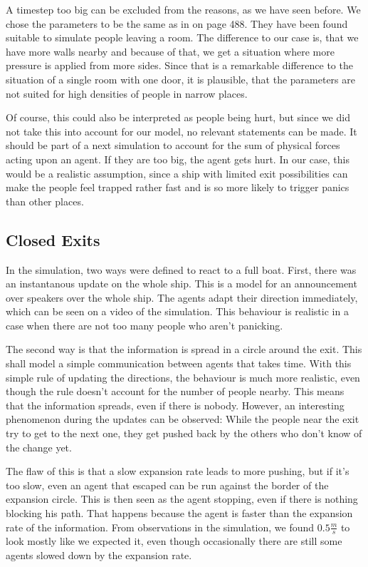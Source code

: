 \documentclass[11pt]{article}
\begin{document}
A timestep too big can be excluded from the reasons, as we have seen before.
We chose the parameters to be the same as in \cite{helbing} on page 488.
They have been found suitable to simulate people leaving a room.
The difference to our case is, that we have more walls nearby and
because of that, we get a situation where more pressure is applied from more sides. 
Since that is a remarkable difference to the situation of a single room with one door, 
it is plausible, that the parameters are not suited for high densities of people in 
narrow places. 

Of course, this could also be interpreted as people being hurt, but since
we did not take this into account for our model, no relevant statements can
be made. It should be part of a next simulation to account for the sum of 
physical forces acting upon an agent. If they are too big, the agent gets hurt.
In our case, this would be a realistic assumption, since a ship with limited
exit possibilities can make the people feel trapped rather fast and is so more
likely to trigger panics than other places.



\subsection{Closed Exits} %
\label{sub:Closed exits}

In the simulation, two ways were defined to react to a full boat.  First, there
was an instantanous update on the whole ship.  This is a model for an
announcement over speakers over the whole ship.  The agents adapt their
direction immediately, which can be seen on a video of the simulation.  This
behaviour is realistic in a case when there are not too many people who aren't
panicking.

The second way is that the information is spread in a circle around the exit.
This shall model a simple communication between agents that takes time.  With
this simple rule of updating the directions, the behaviour is much more
realistic, even though the rule doesn't account for the number of people
nearby.  This means that the information spreads, even if there is nobody.
However, an interesting phenomenon during the updates can be observed:  While
the people near the exit try to get to the next one, they get pushed back by
the others who don't know of the change yet.

The flaw of this is that a slow expansion rate leads to more pushing, but if
it's too slow, even an agent that escaped can be run against the border of the
expansion circle.  This is then seen as the agent stopping, even if there is
nothing blocking his path. That happens because the agent is faster than the
expansion rate of the information. From observations in the simulation, we
found \(0.5\frac{m}{s}\) to look mostly like we expected it, even though
occasionally there are still some agents slowed down by the expansion rate.
\end{document}
